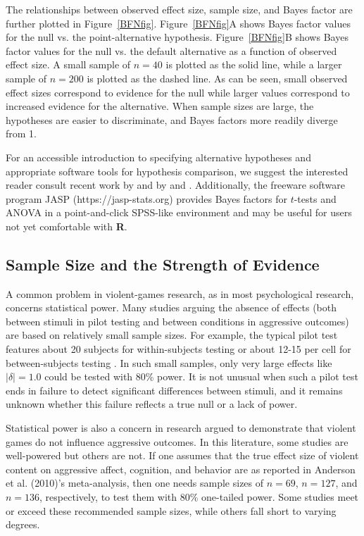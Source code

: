 \documentclass[man]{apa6}
\begin{document}
The relationships between observed effect size, sample size, and Bayes factor are further plotted in Figure~\ref{BFNfig}. Figure~\ref{BFNfig}A shows Bayes factor values for the null vs. the point-alternative hypothesis. Figure~\ref{BFNfig}B shows Bayes factor values for the null vs. the default alternative as a function of observed effect size. A small sample of $n=40$ is plotted as the solid line, while a larger sample of $n=200$ is plotted as the dashed line. As can be seen, small observed effect sizes correspond to evidence for the null while larger values correspond to increased evidence for the alternative. When sample sizes are large, the hypotheses are easier to discriminate, and Bayes factors more readily diverge from 1.  

For an accessible introduction to specifying alternative hypotheses and appropriate software tools for hypothesis comparison, we suggest the interested reader consult recent work by \citet{Dienes:2011,Dienes:2014} and by \citet{Rouder:Morey:2012} and \citet{Rouder:etal:2012}. Additionally, the freeware software program JASP (https://jasp-stats.org) provides Bayes factors for $t$-tests and ANOVA in a point-and-click SPSS-like environment and may be useful for users not yet comfortable with {\bf R}. 

\subsection{Sample Size and the Strength of Evidence}
A common problem in violent-games research, as in most psychological research, concerns statistical power. Many studies arguing the absence of effects (both between stimuli in pilot testing and between conditions in aggressive outcomes) are based on relatively small sample sizes.   For example, the typical pilot test features about 20 subjects for within-subjects testing \citep[e.g.,][]{Arriaga:etal:2008} or about 12-15 per cell for between-subjects testing \citep[e.g.,][]{Anderson:etal:2004,Valadez:Ferguson:2012}. In such small samples, only very large effects like $|\delta| = 1.0$ could be tested with 80\% power. It is not unusual when such a pilot test ends in failure to detect significant differences between stimuli, and it remains unknown whether this failure reflects a true null or a lack of power.

Statistical power is also a concern in research argued to demonstrate that violent games do not influence aggressive outcomes. In this literature, some studies are well-powered but others are not. If one assumes that the true effect size of violent content on aggressive affect, cognition, and behavior are as reported in Anderson et al. (2010)'s meta-analysis, then one needs sample sizes of $n = 69$, $n = 127$, and $n = 136$, respectively, to test them with 80\% one-tailed power. Some studies meet or exceed these recommended sample sizes, while others fall short to varying degrees. 
\end{document}
